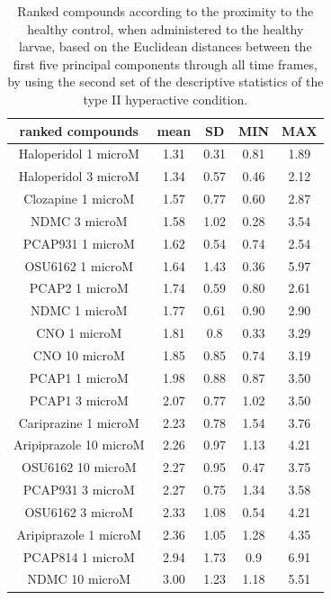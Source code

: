 \begin{table}[h!]\tiny
\centering
\caption{Ranked compounds according to the proximity to the healthy control, when administered to the healthy larvae, based on the Euclidean distances between the first five principal components through all time frames, by using the second set of the descriptive statistics of the type II hyperactive condition.}
\begin{tabular}{|c|c|c|c|c|}
\hline
ranked compounds             & mean & SD   & MIN  & MAX   \\ \hline
Haloperidol 1 microM   & 1.31 & 0.31 & 0.81 & 1.89 \\ \hline
Haloperidol 3 microM   & 1.34 & 0.57 & 0.46 & 2.12 \\ \hline
Clozapine 1 microM     & 1.57 & 0.77 & 0.60  & 2.87 \\ \hline
NDMC 3 microM          & 1.58 & 1.02 & 0.28 & 3.54 \\ \hline
PCAP931 1 microM       & 1.62 & 0.54 & 0.74 & 2.54 \\ \hline
OSU6162 1 microM       & 1.64 & 1.43 & 0.36 & 5.97 \\ \hline
PCAP2 1 microM         & 1.74 & 0.59 & 0.80  & 2.61 \\ \hline
NDMC 1 microM          & 1.77 & 0.61 & 0.90  & 2.90  \\ \hline
CNO 1 microM           & 1.81 & 0.8  & 0.33 & 3.29 \\ \hline
CNO 10 microM          & 1.85 & 0.85 & 0.74 & 3.19 \\ \hline
PCAP1 1 microM         & 1.98 & 0.88 & 0.87 & 3.50  \\ \hline
PCAP1 3 microM         & 2.07 & 0.77 & 1.02 & 3.50  \\ \hline
Cariprazine 1 microM   & 2.23 & 0.78 & 1.54 & 3.76 \\ \hline
Aripiprazole 10 microM & 2.26 & 0.97 & 1.13 & 4.21 \\ \hline
OSU6162 10 microM      & 2.27 & 0.95 & 0.47 & 3.75 \\ \hline
PCAP931 3 microM       & 2.27 & 0.75 & 1.34 & 3.58 \\ \hline
OSU6162 3 microM       & 2.33 & 1.08 & 0.54 & 4.21 \\ \hline
Aripiprazole 1 microM  & 2.36 & 1.05 & 1.28 & 4.35 \\ \hline
PCAP814 1 microM       & 2.94 & 1.73 & 0.9  & 6.91 \\ \hline
NDMC 10 microM         & 3.00    & 1.23 & 1.18 & 5.51 \\ \hline

\end{tabular}
\end{table}
